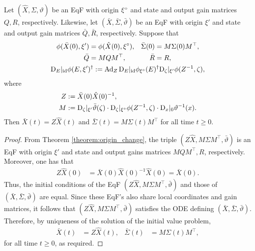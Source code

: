 \documentclass{article}
\begin{document}
\begin{corollary}\label{cor:equivalent_eqfs}
Let $(\hat{X}, \Sigma, \vartheta)$ be an EqF with origin ${\xi}^\circ$ and state and output gain matrices $Q,R$, respectively.
Likewise, let $(\bar{X}, \bar{\Sigma}, \bar{\vartheta})$ be an EqF with origin $\xi'$ and state and output gain matrices $\bar{Q},\bar{R}$, respectively.
Suppose that
\begin{gather*}
    \begin{align}
        \phi(\bar{X}(0), \xi') &= \phi(\hat{X}(0), {\xi}^\circ), &
        \bar{\Sigma}(0) &= M \Sigma(0) M^\top, \\
        \bar{Q} &= M Q M^\top, &
        \bar{R} &= R,
    \end{align} \\
    \mathrm{D}_E |_{\mathrm{id}} \phi(E, \xi')^\dagger := \operatorname{Ad}_Z \mathrm{D}_E |_{\mathrm{id}} \phi_{{\xi}^\circ}(E)^\dagger \mathrm{D}_\zeta |_{\xi'} \phi(Z^{-1}, \zeta),
\end{gather*}
where
\begin{align*}
    Z &:= \bar{X}(0) \hat{X}(0)^{-1}, \\
    M &:= \mathrm{D}_\zeta |_{\xi'} \bar{\vartheta}(\zeta) \cdot \mathrm{D}_\zeta |_{{\xi}^\circ} \phi(Z^{-1}, \zeta) \cdot \mathrm{D}_x|_0 \vartheta^{-1}(x).
\end{align*}
Then $\bar{X}(t) = Z \hat{X}(t)$ and $\bar{\Sigma}(t) = M \Sigma(t) M^\top$ for all time $t \geq 0$.
\end{corollary}

\begin{proof}
From Theorem \ref{theorem:origin_change}, the triple $(Z \hat{X}, M \Sigma M^\top, \bar{\vartheta})$ is an EqF with origin $\xi'$ and state and output gains matrices $M Q M^\top, R$, respectively.
Moreover, one has that
\begin{align*}
    Z \hat{X}(0) &= \bar{X}(0) \hat{X}(0)^{-1} \hat{X}(0) = \bar{X}(0).
\end{align*}
Thus, the initial conditions of the EqF $(Z \hat{X}, M \Sigma M^\top, \bar{\vartheta})$ and those of $(\bar{X}, \bar{\Sigma}, \bar{\vartheta})$ are equal.
Since these EqF's also share local coordinates and gain matrices, it follows that $(Z \hat{X}, M \Sigma M^\top, \bar{\vartheta})$ satisfies the ODE defining $(\bar{X}, \bar{\Sigma}, \bar{\vartheta})$.
Therefore, by uniqueness of the solution of the initial value problem, 
\begin{align*}
    \bar{X}(t) &= Z \hat{X}(t), &
    \bar{\Sigma}(t) &= M \Sigma(t) M^\top,
\end{align*}
for all time $t \geq 0$, as required.
\end{proof}
\end{document}
